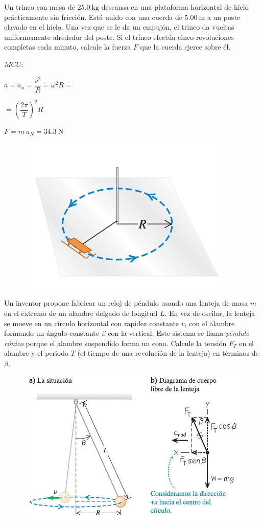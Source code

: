 \begin{prob}
Un trineo con masa de $25.0\ \mathrm{kg}$ descansa en una plataforma horizontal de hielo prácticamente sin fricción. Está unido con una cuerda de $5.00\ \mathrm{m}$ a un poste clavado en el hielo. Una vez que se le da un empujón, el trineo da vueltas uniformemente alrededor del poste. Si el trineo efectúa cinco revoluciones completas cada minuto, calcule la fuerza $F$ que la cuerda ejerce sobre él.	
\end{prob}
\begin{multicols}{2}
$MCU: $

$a=a_n=\dfrac {v^2}R=\omega^2 R = $

$=\left(\dfrac {2 \pi}{T}\right)^2 R $

$F=m \ a_N = 34.3 \ \mathrm{N}$
\begin{figure}[H]
	\centering
	\includegraphics[width=.45\textwidth]{imagenes/imagenes03/T03IM42.png}
	\end{figure}
\end{multicols}

\begin{prob}
	Un inventor propone fabricar un reloj de péndulo usando una lenteja de masa $m$ en el extremo de un alambre delgado de longitud $L$. En vez de oscilar, la lenteja se mueve en un círculo horizontal con rapidez constante $v$, con el alambre formando un ángulo constante $\beta$ con la vertical. Este sistema se llama \textit{péndulo cónico} porque el alambre suspendido forma un cono. Calcule la tensión $F_T$ en el alambre y el periodo $T$ (el tiempo de una revolución de la lenteja) en términos de $\beta$.
\end{prob}
\begin{figure}[H]
	\centering
	\includegraphics[width=.9\textwidth]{imagenes/imagenes03/T03IM43.png}
	\end{figure}

